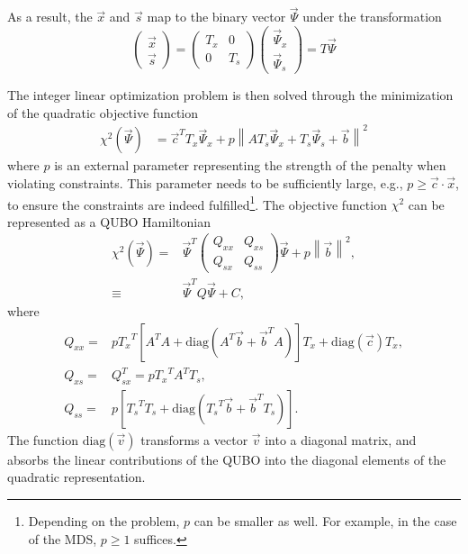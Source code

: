 \documentclass[prd,twocolumn,tightenlines,preprintnumbers,showpacs,superscriptaddress,notitlepage,nofootinbib,eqsecnum,floatfix,longbibliography,aps,10pt]{revtex4-2}
\begin{document}
As a result, the $\vec x$ and $\vec s$ map to the binary vector $\vec \Psi$ under the transformation
\begin{equation}
    \begin{pmatrix}
        \vec x \\ \vec s
    \end{pmatrix}
    =
    \begin{pmatrix}
        T_x & 0 \\ 0 & T_s
    \end{pmatrix}
    \begin{pmatrix}
        \vec \Psi_x \\ \vec \Psi_s
    \end{pmatrix}
    =
    T
    \vec \Psi
\end{equation}

The integer linear optimization problem is then solved through the minimization of the quadratic objective function
\begin{align}
 \chi^2(\vec \Psi)
 &=
 \vec c^T T_x \vec \Psi_x + p \left\| A T_s \vec \Psi_x + T_s \vec \Psi_s + \vec b \right\|^2
\end{align}
where $p$ is an external parameter representing the strength of the penalty when violating constraints.
This parameter needs to be sufficiently large, e.g., $p \geq \vec c \cdot \vec x$, to ensure the constraints are indeed fulfilled\footnote{Depending on the problem, $p$ can be smaller as well.
For example, in the case of the MDS, $p\geq 1$ suffices.}.
The objective function $\chi^2$ can be represented as a QUBO Hamiltonian
\begin{align}
 \chi^2(\vec \Psi) =    &
 \vec \Psi^T
 \begin{pmatrix}
  Q_{xx} & Q_{xs} \\
  Q_{sx} & Q_{ss}
 \end{pmatrix}
 \vec \Psi + p\left \| \vec b \right\|^2, \\
 \equiv &  \vec \Psi^T Q  \vec \Psi + C,
 \label{eq:matrix_form}
\end{align}
where
{\small
\begin{align}
 \label{eq:qubo:components}
 Q_{xx} = & p {T_{x}}^T \left[ A^T A + \mathrm{diag} \left(A^T \vec b + \vec b^T A\right) \right] T_x + \mathrm{diag}(\vec c) T_x,                                                                    \\
 Q_{xs} = & Q_{sx}^T = p {T_{x}}^T A^T T_s,                                                                     \\
 Q_{ss} = & p\left[ {T_{s}}^T T_s + \mathrm{diag}\left( {T_{s}}^T \vec b + \vec b^T T_s\right) \right].
\end{align}}
The function $\mathrm{diag}(\vec v)$ transforms a vector $\vec v$ into a diagonal matrix, and absorbs the linear contributions of the QUBO into the diagonal elements of the quadratic representation.
\end{document}
